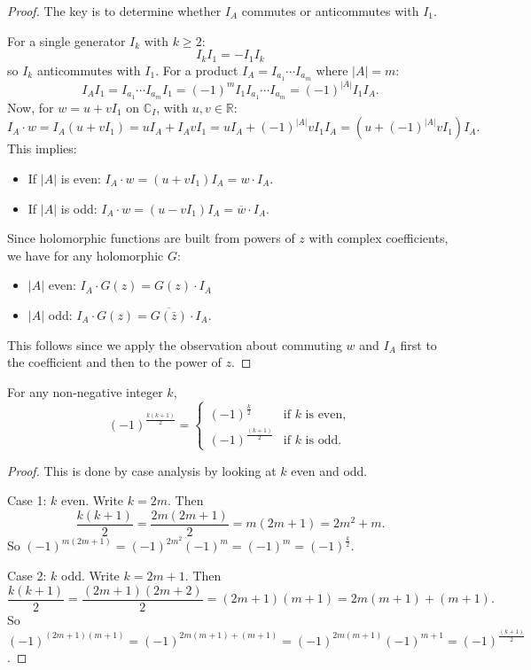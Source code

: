 \documentclass[11pt]{amsart}
\begin{document}
\begin{proof}
The key is to determine whether $I_A$ commutes or anticommutes with $I_1$.

For a single generator $I_k$ with $k \geq 2$:
\[
I_k I_1 = -I_1 I_k
\]
so $I_k$ anticommutes with $I_1$.  For a product $I_A = I_{a_1} \cdots I_{a_m}$ where $|A| = m$:
\[
I_A I_1 = I_{a_1} \cdots I_{a_m} I_1 = (-1)^m I_1 I_{a_1} \cdots I_{a_m} = (-1)^{|A|} I_1 I_A.
\]
Now, for $w = u + vI_1$ on $\mathbb{C}_I$, with $u,v\in\mathbb{R}$:
\[
I_A \cdot w = I_A(u + vI_1) = u I_A +  I_A vI_1  = u I_A + (-1)^{|A|} vI_1 I_A=(u+(-1)^{|A|}vI_1)I_A.
\]
This implies:
\begin{itemize}
\item If $|A|$ is even: $I_A\cdot w = (u +  vI_1) I_A = w \cdot I_A$.
\item If $|A|$ is odd: $I_A \cdot w = (u -  vI_1) I_A = \overline{w} \cdot I_A$.
\end{itemize}
Since holomorphic functions are built from powers of $z$ with complex coefficients, we have for any holomorphic $G$:
\begin{itemize}
    \item $|A|$ even: $I_A\cdot G(z) = G(z)\cdot I_A$
    \item $|A|$ odd: $I_A\cdot G(z) = \overline{G(\bar{z})}\cdot I_A$.
\end{itemize}
This follows since we apply the observation about commuting $w$ and $I_A$ first to the coefficient and then to the power of $z$.
\end{proof}

\begin{lemma}
\label{l:trivialcounting}
For any non-negative integer $k$,
\[
(-1)^{\frac{k(k+1)}{2}} =
\begin{cases}
(-1)^{\frac{k}{2}} & \text{if } k \text{ is even}, \\
(-1)^{\frac{(k+1)}{2}} & \text{if } k \text{ is odd}.
\end{cases}
\]
\end{lemma}

\begin{proof}
This is done by case analysis by looking at $k$ even and odd.

Case 1: $k$ even. Write $k = 2m$. Then
\[
\frac{k(k+1)}{2} = \frac{2m(2m+1)}{2} = m(2m+1)=2m^2+m.
\]
So $(-1)^{m(2m+1)} = (-1)^{2m^2}(-1)^m=(-1)^m = (-1)^{\frac{k}{2}}$.

Case 2: $k$ odd. Write $k = 2m+1$. Then
\[
\frac{k(k+1)}{2} = \frac{(2m+1)(2m+2)}{2} = (2m+1)(m+1)=2m(m+1)+(m+1).
\]
So $(-1)^{(2m+1)(m+1)} = (-1)^{2m(m+1)+(m+1)} = (-1)^{2m(m+1)}(-1)^{m+1}= (-1)^{\frac{(k+1)}{2}}$.
\end{proof}
\end{document}
